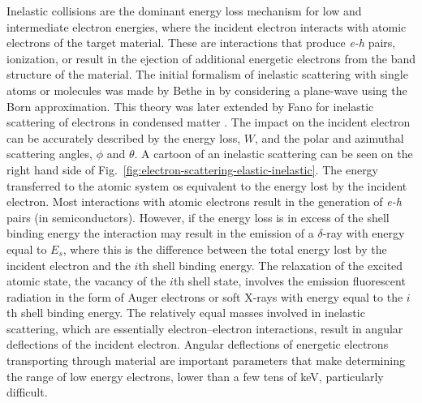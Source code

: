 Inelastic collisions are the dominant energy loss mechanism for low and intermediate electron energies, where the incident electron interacts with atomic electrons of the target material.
These are interactions that produce \emph{e-h} pairs, ionization, or result in the ejection of additional energetic electrons from the band structure of the material.
The initial formalism of inelastic scattering with single atoms or molecules was made by Bethe in \cite{bethe1930theorie,bethe1932bremsformel} by considering a plane-wave using the Born approximation.
This theory was later extended by Fano for inelastic scattering of electrons in condensed matter \cite{fano1964penetration}.
The impact on the incident electron can be accurately described by the energy loss, $W$, and the polar and azimuthal scattering angles, $\phi$ and $\theta$.
A cartoon of an inelastic scattering can be seen on the right hand side of Fig.~\ref{fig:electron-scattering-elastic-inelastic}. 
The energy transferred to the atomic system os equivalent to the energy lost by the incident electron.
Most interactions with atomic electrons result in the generation of \emph{e-h} pairs (in semiconductors).
However, if the energy loss is in excess of the shell binding energy the interaction may result in the emission of a $\delta$-ray with energy equal to $E_s$, where this is the difference between the total energy lost by the incident electron and the $i$th shell binding energy.
The relaxation of the excited atomic state, the vacancy of the $i$th shell state, involves the emission fluorescent radiation in the form of Auger electrons or soft X-rays with energy equal to the $i$th shell binding energy.
The relatively equal masses involved in inelastic scattering, which are essentially electron--electron interactions, result in angular deflections of the incident electron.
Angular deflections of energetic electrons transporting through material are important parameters that make determining the range of low energy electrons, lower than a few tens of keV, particularly difficult.

